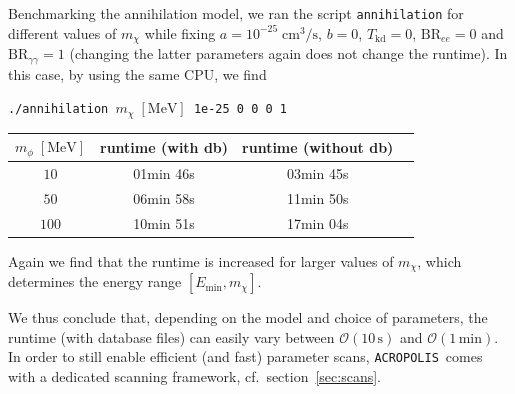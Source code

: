 \documentclass[11pt,a4paper]{article}
\newcommand{\acropolis}{\texttt{ACROPOLIS}~}
\begin{document}
Benchmarking the annihilation model, we ran the script \texttt{annihilation} for different values of $m_\chi$ while fixing $a=10^{-25}\;\mathrm{cm^3/s}$, $b=0$, $T_\text{kd} = 0$, $\text{BR}_{ee} = 0$ and $\text{BR}_{\gamma\gamma}=1$ (changing the latter parameters again does not change the runtime). In this case, by using the same CPU, we find
\begin{center}
	\texttt{./annihilation $m_\chi\;\mathrm{[MeV]}$ 1e-25 0 0 0 1}
	\begin{tabular}{|c|c|c|c|}
		\hline
		$m_\phi\;\mathrm{[MeV]}$ &  runtime (with db) & runtime (without db) \\
		\hline\hline
		$10$ & 01min 46s & 03min 45s\\
		\hline
		$50$ & 06min 58s & 11min 50s \\
		\hline
		$100$ & 10min 51s & 17min 04s \\
		\hline
	\end{tabular}
\end{center}
Again we find that the runtime is increased for larger values of $m_\chi$, which determines the energy range $[E_\text{min}, m_\chi]$.

We thus conclude that, depending on the model and choice of parameters, the runtime (with database files) can easily vary between $\mathcal{O}(10\,\mathrm{s})$ and $\mathcal{O}(1\,\mathrm{min})$. In order to still enable efficient (and fast) parameter scans, \acropolis comes with a dedicated scanning framework, cf.\ section~\ref{sec:scans}.



\end{document}
